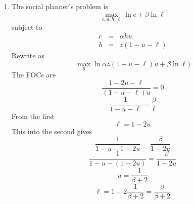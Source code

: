 \documentclass{article}
\begin{document}
\begin{enumerate}
\begin{enumerate}
\item The social planner's problem is 
\begin{equation*}
\underset{c,u,h,\ell }{\max }\ln c+\beta \ln \ell
\end{equation*}%
subject to 
\begin{eqnarray*}
c &=&\alpha hu \\
h &=&z(1-u-\ell )
\end{eqnarray*}%
Rewrite as%
\begin{equation*}
\underset{u}{\max }\ln \alpha z(1-u-\ell )u+\beta \ln \ell )
\end{equation*}%
The FOCs are 
\begin{equation*}
\frac{1-2u-\ell }{\left( 1-u-\ell \right) u}=0
\end{equation*}%
\begin{equation*}
\frac{1}{1-u-\ell }=\frac{\beta }{\ell }
\end{equation*}%
From the first 
\begin{equation*}
\ell =1-2u
\end{equation*}%
This into the second gives 
\begin{equation*}
\frac{1}{1-u-1-2u}=\frac{\beta }{1-2u}
\end{equation*}%
\begin{equation*}
\frac{1}{1-u-\left( 1-2u\right) }=\frac{\beta }{1-2u}
\end{equation*}%
\begin{equation*}
u=\frac{1}{\beta +2}
\end{equation*}%
\begin{equation*}
\ell =1-2\frac{1}{\beta +2}=\frac{\beta }{\beta +2}
\end{equation*}
\end{enumerate}
\end{enumerate}
\end{document}
